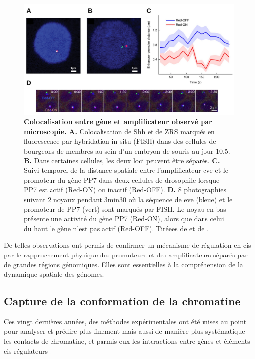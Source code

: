 \begin{figure}[h]
    \centering
    \includegraphics[width=1\textwidth, page=1] {figures/introduction/fig15-17.png}
    \caption[Colocalisation entre gène et amplificateur observé par microscopie.]{
    \textbf{Colocalisation entre gène et amplificateur observé par microscopie.}
    \textbf{A.} Colocalisation de Shh et de ZRS marqués en fluorescence par hybridation in situ (FISH) dans des cellules de bourgeons de membres au sein d'un embryon de souris au jour 10.5.
    \textbf{B.} Dans certaines cellules, les deux loci peuvent être séparés.
    \textbf{C.} Suivi temporel de la distance spatiale entre l'amplificateur eve et le promoteur du gène PP7 dans deux cellules de drosophile lorsque PP7 est actif (Red-ON) ou inactif (Red-OFF).
    \textbf{D.} 8 photographies suivant 2 noyaux pendant 3min30 où la séquence de eve (bleue) et le promoteur de PP7 (vert) sont marqués par FISH. Le noyau en bas présente une activité du gène PP7 (Red-ON), alors que dans celui du haut le gène n'est pas actif (Red-OFF).
    Tiréees de \citep{amano_chromosomal_2009} et de \citep{chen_dynamic_2018}.\\
    }
    \label{fig:fig15-17}
\end{figure}

De telles observations ont permis de confirmer un mécanisme de régulation en \gls{cis} par le rapprochement physique des promoteurs et des \glspl{amplificateur} séparés par de grandes régions génomiques. Elles sont  essentielles à la compréhension de la dynamique spatiale des génomes.

\subsection{Capture de la conformation de la chromatine}
\label{subsec:HiC}

Ces vingt dernières années, des méthodes expérimentales ont été mises au point pour analyser et prédire plus finement mais aussi de manière plus systématique les contacts de chromatine, et parmis eux les interactions entre gènes et éléments \gls{cis}-régulateurs \citep{dekker_capturing_2002, simonis_nuclear_2006, dostie_chromosome_2006, lieberman-aiden_comprehensive_2009,schoenfelder_pluripotent_2015}.  \\

